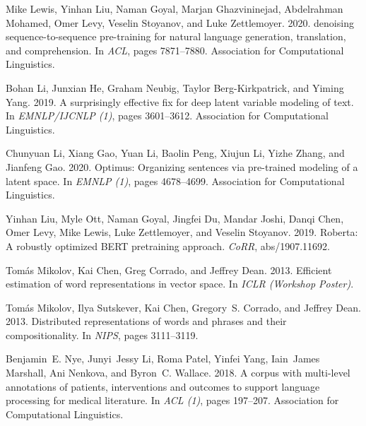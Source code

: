 \documentclass[11pt]{article}
\begin{document}
\begin{thebibliography}{59}
Mike Lewis, Yinhan Liu, Naman Goyal, Marjan Ghazvininejad, Abdelrahman Mohamed,
  Omer Levy, Veselin Stoyanov, and Luke Zettlemoyer. 2020.
 denoising sequence-to-sequence pre-training for natural
  language generation, translation, and comprehension.
\newblock In \emph{{ACL}}, pages 7871--7880. Association for Computational
  Linguistics.

Bohan Li, Junxian He, Graham Neubig, Taylor Berg{-}Kirkpatrick, and Yiming
  Yang. 2019.
\newblock A surprisingly effective fix for deep latent variable modeling of
  text.
\newblock In \emph{{EMNLP/IJCNLP} {(1)}}, pages 3601--3612. Association for
  Computational Linguistics.

Chunyuan Li, Xiang Gao, Yuan Li, Baolin Peng, Xiujun Li, Yizhe Zhang, and
  Jianfeng Gao. 2020.
\newblock Optimus: Organizing sentences via pre-trained modeling of a latent
  space.
\newblock In \emph{{EMNLP} {(1)}}, pages 4678--4699. Association for
  Computational Linguistics.

Yinhan Liu, Myle Ott, Naman Goyal, Jingfei Du, Mandar Joshi, Danqi Chen, Omer
  Levy, Mike Lewis, Luke Zettlemoyer, and Veselin Stoyanov. 2019.
\newblock Roberta: {A} robustly optimized {BERT} pretraining approach.
\newblock \emph{CoRR}, abs/1907.11692.

Tom{\'{a}}s Mikolov, Kai Chen, Greg Corrado, and Jeffrey Dean.
  2013{}.
\newblock Efficient estimation of word representations in vector space.
\newblock In \emph{{ICLR} (Workshop Poster)}.

Tom{\'{a}}s Mikolov, Ilya Sutskever, Kai Chen, Gregory~S. Corrado, and Jeffrey
  Dean. 2013{}.
\newblock Distributed representations of words and phrases and their
  compositionality.
\newblock In \emph{{NIPS}}, pages 3111--3119.

Benjamin~E. Nye, Junyi~Jessy Li, Roma Patel, Yinfei Yang, Iain~James Marshall,
  Ani Nenkova, and Byron~C. Wallace. 2018.
\newblock A corpus with multi-level annotations of patients, interventions and
  outcomes to support language processing for medical literature.
\newblock In \emph{{ACL} {(1)}}, pages 197--207. Association for Computational
  Linguistics.


\end{thebibliography}
\end{document}
